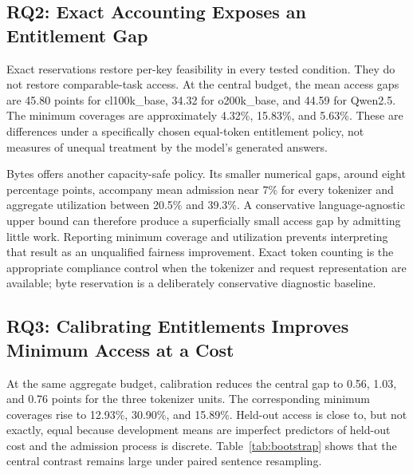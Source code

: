 \documentclass[manuscript,screen]{acmart}
\begin{document}
\subsection{RQ2: Exact Accounting Exposes an Entitlement Gap}
Exact reservations restore per-key feasibility in every tested condition. They do not restore comparable-task access. At the central budget, the mean access gaps are 45.80 points for cl100k\_base, 34.32 for o200k\_base, and 44.59 for Qwen2.5. The minimum coverages are approximately 4.32\%, 15.83\%, and 5.63\%. These are differences under a specifically chosen equal-token entitlement policy, not measures of unequal treatment by the model's generated answers.

Bytes offers another capacity-safe policy. Its smaller numerical gaps, around eight percentage points, accompany mean admission near 7\% for every tokenizer and aggregate utilization between 20.5\% and 39.3\%. A conservative language-agnostic upper bound can therefore produce a superficially small access gap by admitting little work. Reporting minimum coverage and utilization prevents interpreting that result as an unqualified fairness improvement. Exact token counting is the appropriate compliance control when the tokenizer and request representation are available; byte reservation is a deliberately conservative diagnostic baseline.

\subsection{RQ3: Calibrating Entitlements Improves Minimum Access at a Cost}
At the same aggregate budget, calibration reduces the central gap to 0.56, 1.03, and 0.76 points for the three tokenizer units. The corresponding minimum coverages rise to 12.93\%, 30.90\%, and 15.89\%. Held-out access is close to, but not exactly, equal because development means are imperfect predictors of held-out cost and the admission process is discrete. Table~\ref{tab:bootstrap} shows that the central contrast remains large under paired sentence resampling.

\begin{table}[t]
\centering\small
\caption{Paired sentence-bootstrap sensitivity intervals, central burst condition, 1,000 replicates per tokenizer. Gap reduction compares Exact with Calibrated. Throughput ratio is Calibrated/Exact. Minimum access refers to Calibrated. The percentile adjustment covers three tokenizer comparisons for each statistic, conditional on this benchmark.}
\label{tab:bootstrap}
\end{table}
\end{document}
